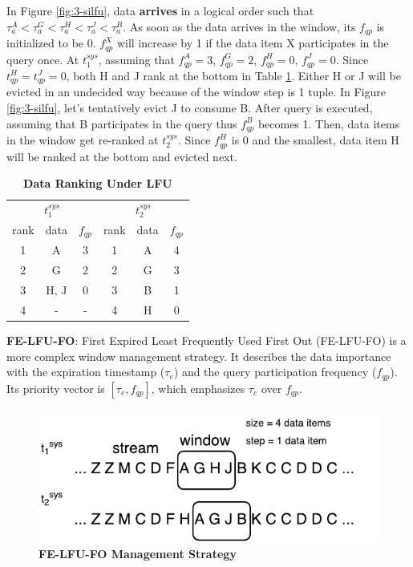 In Figure \ref{fig:3-silfu}, data \textbf{arrives} in a logical order such that $\tau^{A}_{a} < \tau^{G}_{a} < \tau^{H}_{a} < \tau^{J}_{a} < \tau^{B}_{a}$. 
As soon as the data arrives in the window, its $f_{qp}$ is initialized to be 0.
$f^{X}_{qp}$ will increase by 1 if the data item X participates in the query once.
At $t^{sys}_{1}$, assuming that $f^{A}_{qp} = 3$, $f^{G}_{qp} = 2$, $f^{H}_{qp} = 0$, $f^{J}_{qp} = 0$. 
Since $t^{H}_{qp} = t^{J}_{qp} = 0$, both H and J rank at the bottom in Table \ref{tab:lfu}. 
Either H or J will be evicted in an undecided way because of the window step is 1 tuple. 
In Figure \ref{fig:3-silfu}, let's tentatively evict J to consume B. 
After query is executed, assuming that B participates in the query thus $f^{B}_{qp}$ becomes 1.
Then, data items in the window get re-ranked at $t^{sys}_{2}$.
Since $f^{H}_{qp}$ is 0 and the smallest, data item H will be ranked at the bottom and evicted next. 

\begin{table}[!htbp]
\centering
\caption{\textbf{Data Ranking Under LFU}}
\label{tab:lfu}
\begin{tabular}{|c|c|c||c|c|c|}
\hline
\multicolumn{3}{|c||}{$t^{sys}_{1}$} & \multicolumn{3}{c|}{$t^{sys}_{2}$} \\ \hhline{|===#===|}
rank & data & $f_{qp}$ & rank & data & $f_{qp}$ \\ \hhline{|=|=|=#=|=|=|}
1 & A & 3 & 1 & A & 4 \\ \hline
2 & G & 2 & 2 & G & 3 \\ \hline
3 & H, J & 0 & 3 & B & 1 \\ \hline
4 & - & - & 4 & H & 0 \\ \hline
\end{tabular}
\end{table}

\textbf{FE-LFU-FO}:
First Expired Least Frequently Used First Out (FE-LFU-FO) is a more complex window management strategy. 
It describes the data importance with the expiration timestamp ($\tau_{e}$) and the query participation frequency ($f_{qp}$).
Its priority vector is $[\tau_{e}, f_{qp}]$, which emphasizes $\tau_{e}$ over $f_{qp}$. 

\begin{figure}[!htbp]
	\centering
    \includegraphics[width=5in]{img/3-sifelfufo.pdf}
    \caption{\textbf{FE-LFU-FO Management Strategy}}
    \label{fig:3-sifelfufo}
\end{figure}

